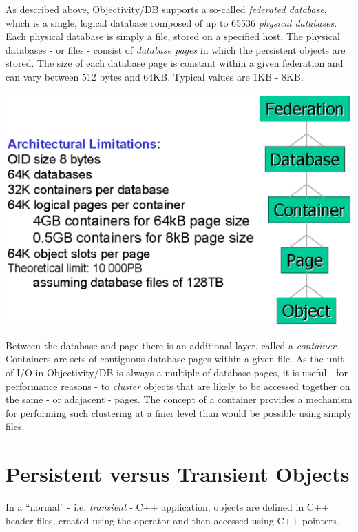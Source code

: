 \par

As described above, Objectivity/DB supports a so-called \emph{federated
database}, which is a single, logical database composed of up to
65536 \emph{physical databases}.  Each physical database is
simply a file, stored on a specified host. The physical databases - or
files - consist of \emph{database pages} in which the persistent
objects are stored. The size of each database page is constant within
a given federation and can vary between 512 bytes and 64KB. Typical
values are 1KB - 8KB.

\par

\includegraphics[width=.7\linewidth, scale=.5]{fdb_structure}

\par

Between the database and page there is an additional layer, called a
\emph{container}.  Containers are sets of contiguous database
pages within a given file. As the unit of I/O in Objectivity/DB is always a
multiple of database pages, it is useful - for performance reasons -
to \emph{cluster} objects that are likely to be accessed
together on the same - or adajacent - pages. The concept of a
container provides a mechanism for performing such clustering at a
finer level than would be possible using simply files.
\section{Persistent versus Transient Objects}

\par

In a ``normal'' - i.e. \emph{transient} - C++ application,
objects are defined in C++ header files, created using the 
operator and then accessed using C++ pointers.

\par

